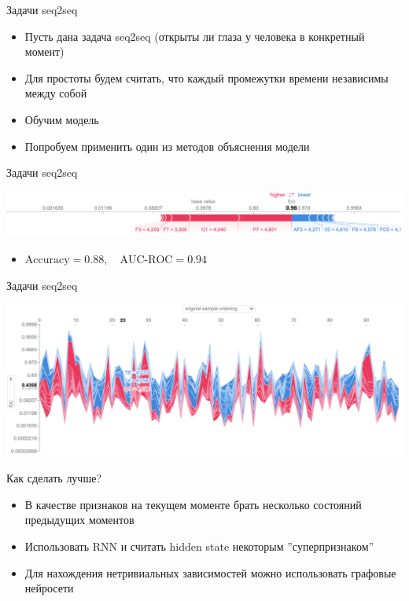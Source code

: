 \documentclass[fleqn, xcolor=x11names]{beamer}
\begin{document}
\begin{frame}{Задачи seq2seq}

    \begin{itemize}
        \item Пусть дана задача seq2seq (открыты ли глаза у человека в конкретный момент)
        \item Для простоты будем считать, что каждый промежутки времени независимы между собой
        \item Обучим модель
        \item Попробуем применить один из методов объяснения модели
    \end{itemize}

\end{frame}

\begin{frame}{Задачи seq2seq}

    \centering
    \includegraphics[width=\linewidth]{shap_timestamp.png}

    \vspace{20pt}

    \begin{itemize}
        \item $\text{Accuracy} = 0.88, \quad \text{AUC-ROC} = 0.94$
    \end{itemize}

\end{frame}

\begin{frame}{Задачи seq2seq}

    \centering
    \includegraphics[width=\linewidth]{shap_timeseries.png}

\end{frame}

\begin{frame}{Как сделать лучше?}

    \begin{itemize}
        \item В качестве признаков на текущем моменте брать несколько состояний предыдущих моментов
        \item Использовать RNN и считать hidden state некоторым ''суперпризнаком''
        \item Для нахождения нетривиальных зависимостей можно использовать графовые нейросети
    \end{itemize}
\end{frame}
\end{document}
